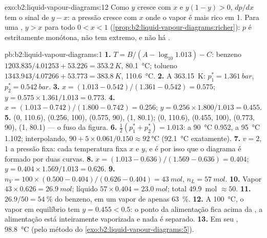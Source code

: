 \begin{solution}{exo:b2:liquid-vapour-diagrams:12}
Como $y$ cresce com $x$ e $y(1 - y) > 0$, $dp/dx$ tem o sinal de $y - x$:
a pressão cresce com $x$ onde o vapor é mais rico em 1. Para uma , $y > x$ para todo $0 < x < 1$ (\cref{prop:b2:liquid-vapour-diagrams:richer}):
$p$ é estritamente monótona, não tem extremo, e não há .
\end{solution}

\begin{solution}{pb:b2:liquid-vapour-diagrams:1}
\textbf{1.} $T = B/(A - \log_{10}1.013) - C$: benzeno $1203.835/4.01253 + 53.226 =
\qty{353.2}{K}$, \qty{80.1}{\degreeCelsius}; tolueno $1343.943/4.07266 + 53.773 =
\qty{383.8}{K}$, \qty{110.6}{\degreeCelsius}.
\textbf{2.} A \qty{363.15}{K}: $p_1^* = \qty{1.361}{bar}$, $p_2^* = \qty{0.542}{bar}$.
\textbf{3.} $x = (1.013 - 0.542)/(1.361 - 0.542) = 0.575$; $y = 0.575 \times
1.361/1.013 = 0.773$.
\textbf{4.} $x = (1.013 - 0.742)/(1.800 - 0.742) = 0.256$; $y = 0.256 \times
1.800/1.013 = 0.455$.
\textbf{5.}  (0, 110.6), (0.256, 100), (0.575, 90), (1, 80.1);
 (0, 110.6), (0.455, 100), (0.773, 90), (1, 80.1) --- o fuso
da figura.
\textbf{6.} $\frac12(p_1^* + p_2^*) = 1.013$: a \qty{90}{\degreeCelsius} 0.952, a
\qty{95}{\degreeCelsius} 1.102; interpolando, $90 + 5 \times 0.061/0.150 \approx
\qty{92}{\degreeCelsius}$ (\qty{92.1}{\degreeCelsius} exatamente).
\textbf{7.} $v = 2$, 1 a pressão fixa: cada temperatura fixa $x$ e $y$,
e é por isso que o diagrama é formado por duas curvas.
\textbf{8.} $x = (1.013 - 0.636)/(1.569 - 0.636) = 0.404$; $y = 0.404 \times
1.569/1.013 = 0.626$.
\textbf{9.} $n_V = 100 \times (0.500 - 0.404)/(0.626 - 0.404) = \qty{43}{mol}$,
$n_L = \qty{57}{mol}$.
\textbf{10.} Vapor $43 \times 0.626 = \qty{26.9}{mol}$; líquido $57 \times 0.404
= \qty{23.0}{mol}$; total \qty{49.9}{mol} $\approx 50$.
\textbf{11.} $26.9/50 = 54~\%$ do benzeno, em um vapor de apenas 63~\%.
\textbf{12.} A \qty{100}{\degreeCelsius}, o vapor em equilíbrio tem $y =
0.455 < 0.5$: o ponto da alimentação fica acima da , a
alimentação está inteiramente vaporizada e nada é separado.
\textbf{13.} Em seu , \qty{98.8}{\degreeCelsius} (pelo método do
\cref{exo:b2:liquid-vapour-diagrams:5}).

\end{solution}
